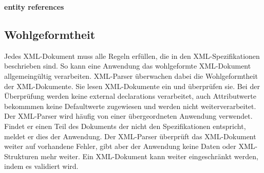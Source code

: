 









\textbf{\huge{entity references}}

\subsection{Wohlgeformtheit}

Jedes XML-Dokument muss alle Regeln erfüllen, die in den XML-Spezifikationen beschrieben sind. So kann eine Anwendung das wohlgeformte XML-Dokument allgemeingültig verarbeiten. XML-Parser überwachen dabei die Wohlgeformtheit der XML-Dokumente. Sie lesen XML-Dokumente ein und überprüfen sie. Bei der Überprüfung werden keine external declarations verarbeitet, auch Attributwerte bekommmen keine Defaultwerte zugewiesen und werden nicht weiterverarbeitet. Der XML-Parser wird häufig von einer übergeordneten Anwendung verwendet. Findet er einen Teil des Dokuments der nicht den Spezifikationen entspricht, meldet er dies der Anwendung. Der XML-Parser überprüft das XML-Dokument weiter auf vorhandene Fehler, gibt aber der Anwendung keine Daten oder XML-Strukturen mehr weiter. Ein XML-Dokument kann weiter eingeschränkt werden, indem es validiert wird.

